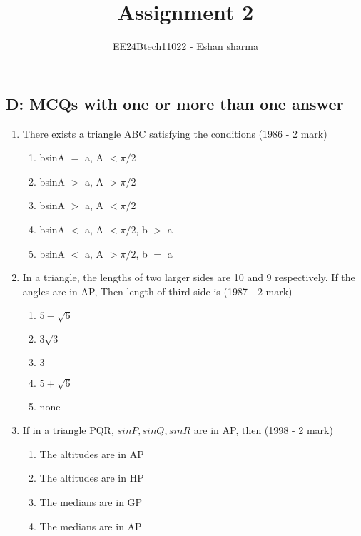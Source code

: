 \documentclass[journal,12pt,twocolumn]{IEEEtran}
\theoremstyle{remark}
\begin{document}

\vspace{3cm}

\title{Assignment 2}
\author{EE24Btech11022 - Eshan sharma}
\maketitle
\newpage
\bigskip

\renewcommand{\thefigure}{\theenumi}
\renewcommand{\thetable}{\theenumi}


\subsection*{D: MCQs with one or more than one answer}
\begin{enumerate}[label=\arabic*.]
    \item There exists a triangle ABC satisfying the conditions
    \hfill{(1986 - 2 mark)}
    \begin{enumerate}[label=(\alph*)]
    \item bsinA $=$ a, A $<\pi/2$
    \item bsinA $>$ a, A $>\pi/2$
    \item bsinA $>$ a, A $<\pi/2$
    \item bsinA $<$ a, A $<\pi/2$, b $>$ a
    \item bsinA $<$ a, A $>\pi/2$, b $=$ a
    \end{enumerate}
    \item In a triangle, the lengths of two larger sides are 10 and 9 respectively. If the angles are in AP, Then length of third side is
    \hfill{(1987 - 2 mark)}
    \begin{enumerate}[label=(\alph*)]
    \item $5-\sqrt{6}$ 
    \item $3\sqrt{3}$
    \item $3$
    \item $5+\sqrt{6}$ 
    \item none
    \end{enumerate}
    \item If in a triangle PQR, $sinP, sinQ, sinR$ are in AP, then
    \hfill{(1998 - 2 mark)}
    \begin{enumerate}[label=(\alph*)]
    \item The altitudes are in AP
    \item The altitudes are in HP
    \item The medians are in GP
    \item The medians are in AP

\end{enumerate}
\end{enumerate}
\end{document}
